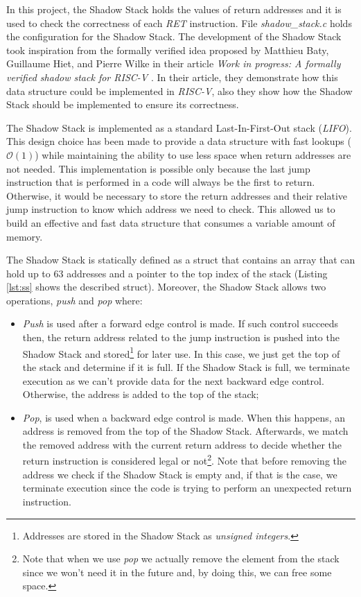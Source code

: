 In this project, the Shadow Stack holds the values of return addresses and it is
used to check the correctness of each \textit{RET} instruction. File \textit{shadow\_stack.c}
holds the configuration for the Shadow Stack. The development of the Shadow Stack
took inspiration from the formally verified idea proposed by Matthieu Baty,
Guillaume Hiet, and Pierre Wilke in their article \textit{Work in progress: A formally
verified shadow stack for RISC-V} \cite{shadowstack}. In their article, they
demonstrate how this data structure could be implemented in \textit{RISC-V},
also they show how the Shadow Stack should be implemented to ensure its
correctness.

The Shadow Stack is implemented as a standard Last-In-First-Out stack (\textit{LIFO}).
This design choice has been made to provide a data structure with fast lookups ($\mathcal{O}
(1)$) while maintaining the ability to use less space when return addresses are
not needed. This implementation is possible only because the last jump instruction
that is performed in a code will always be the first to return. Otherwise, it would
be necessary to store the return addresses and their relative jump instruction to
know which address we need to check. This allowed us to build an effective and
fast data structure that consumes a variable amount of memory.

The Shadow Stack is statically defined as a struct that contains an array that
can hold up to $63$ addresses and a pointer to the top index of the stack (Listing
\ref{lst:ss} shows the described struct). Moreover, the Shadow Stack allows two
operations, \textit{push} and \textit{pop} where:
\begin{itemize}
  \item \textit{Push} is used after a forward edge control is made. If such control
    succeeds then, the return address related to the jump instruction is pushed
    into the Shadow Stack and stored\footnote{Addresses are stored in the Shadow
    Stack as \textit{unsigned integers}.} for later use. In this case, we just get
    the top of the stack and determine if it is full. If the Shadow Stack is
    full, we terminate execution as we can't provide data for the next backward edge
    control. Otherwise, the address is added to the top of the stack;

  \item \textit{Pop}, is used when a backward edge control is made. When this
    happens, an address is removed from the top of the Shadow Stack. Afterwards,
    we match the removed address with the current return address to decide whether
    the return instruction is considered legal or not\footnote{Note that when we
    use \textit{pop} we actually remove the element from the stack since we won't
    need it in the future and, by doing this, we can free some space.}. Note that
    before removing the address we check if the Shadow Stack is empty and, if
    that is the case, we terminate execution since the code is trying to perform
    an unexpected return instruction.
\end{itemize}

